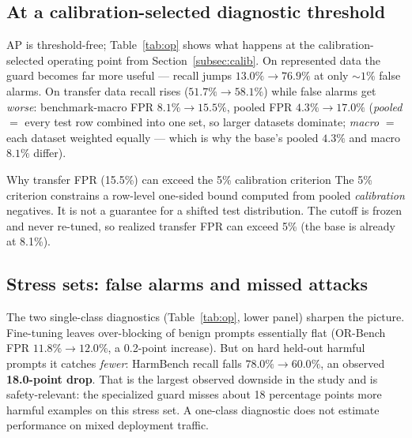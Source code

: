 \documentclass[11pt]{article}
\begin{document}
\subsection{At a calibration-selected diagnostic threshold}
AP is threshold-free; Table~\ref{tab:op} shows what happens at the calibration-selected
operating point from Section~\ref{subsec:calib}. On represented data the
guard becomes far more useful --- recall jumps $13.0\%\!\to\!76.9\%$ at only ${\sim}1\%$ false
alarms. On transfer data recall rises ($51.7\%\!\to\!58.1\%$) while false alarms get
\emph{worse}: benchmark-macro FPR $8.1\%\!\to\!15.5\%$, pooled FPR $4.3\%\!\to\!17.0\%$
(\emph{pooled} $=$ every test row combined into one set, so larger datasets dominate;
\emph{macro} $=$ each dataset weighted equally --- which is why the base's pooled $4.3\%$ and
macro $8.1\%$ differ).

\begin{takeaway}{Why transfer FPR (15.5\%) can exceed the 5\% calibration criterion}
\small
The 5\% criterion constrains a row-level one-sided bound computed from pooled \emph{calibration}
negatives. It is not a guarantee for a shifted test distribution. The cutoff is frozen and
never re-tuned, so realized transfer FPR can exceed 5\% (the base is already at 8.1\%).
\end{takeaway}

\subsection{Stress sets: false alarms and missed attacks}
The two single-class diagnostics (Table~\ref{tab:op}, lower panel) sharpen the picture.
Fine-tuning leaves over-blocking of benign prompts essentially flat (OR-Bench FPR
$11.8\%\!\to\!12.0\%$, a 0.2-point increase). But on hard held-out harmful prompts it catches
\emph{fewer}: HarmBench recall falls $78.0\%\!\to\!60.0\%$, an observed
\textbf{18.0-point drop}. That is the largest observed downside in the study and is
safety-relevant: the specialized guard misses about 18 percentage points more harmful examples
on this stress set. A one-class diagnostic does not estimate performance on mixed deployment
traffic.
\end{document}
